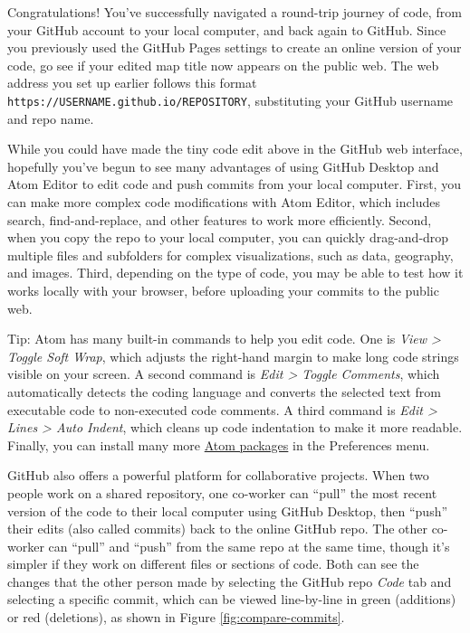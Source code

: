 \documentclass[
  english,
]{book}
\begin{document}
Congratulations! You've successfully navigated a round-trip journey of code, from your GitHub account to your local computer, and back again to GitHub. Since you previously used the GitHub Pages settings to create an online version of your code, go see if your edited map title now appears on the public web. The web address you set up earlier follows this format \texttt{https://USERNAME.github.io/REPOSITORY}, substituting your GitHub username and repo name.

While you could have made the tiny code edit above in the GitHub web interface, hopefully you've begun to see many advantages of using GitHub Desktop and Atom Editor to edit code and push commits from your local computer. First, you can make more complex code modifications with Atom Editor, which includes search, find-and-replace, and other features to work more efficiently. Second, when you copy the repo to your local computer, you can quickly drag-and-drop multiple files and subfolders for complex visualizations, such as data, geography, and images. Third, depending on the type of code, you may be able to test how it works locally with your browser, before uploading your commits to the public web.

Tip: Atom has many built-in commands to help you edit code. One is \emph{View \textgreater{} Toggle Soft Wrap}, which adjusts the right-hand margin to make long code strings visible on your screen. A second command is \emph{Edit \textgreater{} Toggle Comments}, which automatically detects the coding language and converts the selected text from executable code to non-executed code comments. A third command is \emph{Edit \textgreater{} Lines \textgreater{} Auto Indent}, which cleans up code indentation to make it more readable. Finally, you can install many more \href{https://atom.io/packages}{Atom packages} in the Preferences menu.

GitHub also offers a powerful platform for collaborative projects. When two people work on a shared repository, one co-worker can ``pull'' the most recent version of the code to their local computer using GitHub Desktop, then ``push'' their edits (also called commits) back to the online GitHub repo. The other co-worker can ``pull'' and ``push'' from the same repo at the same time, though it's simpler if they work on different files or sections of code. Both can see the changes that the other person made by selecting the GitHub repo \emph{Code} tab and selecting a specific commit, which can be viewed line-by-line in green (additions) or red (deletions), as shown in Figure \ref{fig:compare-commits}.
\end{document}
